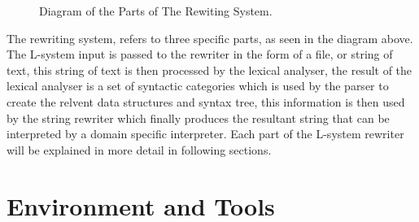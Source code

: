 \begin{figure}[htbp]
	{\centering
		\setlength{\fboxrule}{1pt}
		\vspace{7px}
		\caption{Diagram of the Parts of The Rewiting System.} \label{3D rotations}
	}
\end{figure}
\FloatBarrier

The rewriting system, refers to three specific parts, as seen in the diagram above. The L-system input is passed to the rewriter in the form of a file, or string of text, this string of text is then processed by the lexical analyser, the result of the lexical analyser is a set of syntactic categories which is used by the parser to create the relvent data structures and syntax tree, this information is then used by the string rewriter which finally produces the resultant string that can be interpreted by a domain specific interpreter. Each part of the L-system rewriter will be explained in more detail in following sections.

\section{Environment and Tools}

